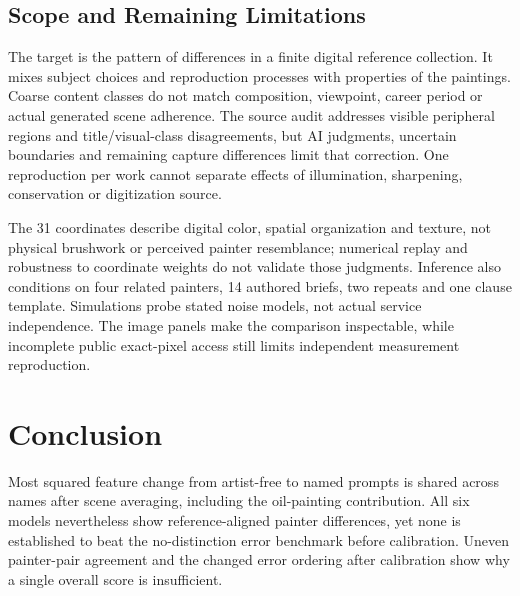 \subsection{Scope and Remaining Limitations}
The target is the pattern of differences in a finite digital reference
collection. It mixes subject choices and reproduction processes with properties
of the paintings. Coarse content classes do not match composition, viewpoint,
career period or actual generated scene adherence. The source audit addresses
visible peripheral regions and title/visual-class disagreements, but AI
judgments, uncertain boundaries and remaining capture differences limit that
correction. One reproduction per work cannot separate effects of illumination,
sharpening, conservation or digitization source.

The 31 coordinates describe digital color, spatial organization and texture,
not physical brushwork or perceived painter resemblance; numerical replay and
robustness to coordinate weights do not validate those judgments.
Inference also conditions on four related
painters, 14 authored briefs, two repeats and one clause template. Simulations
probe stated noise models, not actual service independence. The image panels
make the comparison inspectable, while incomplete public exact-pixel access
still limits independent measurement reproduction.

\section{Conclusion}
Most squared feature change from artist-free to named prompts is shared across
names after scene averaging, including the oil-painting contribution.
All six models nevertheless show reference-aligned painter differences, yet none
is established to beat the no-distinction error benchmark before calibration.
Uneven painter-pair agreement and the changed error ordering after calibration
show why a single overall score is insufficient.
